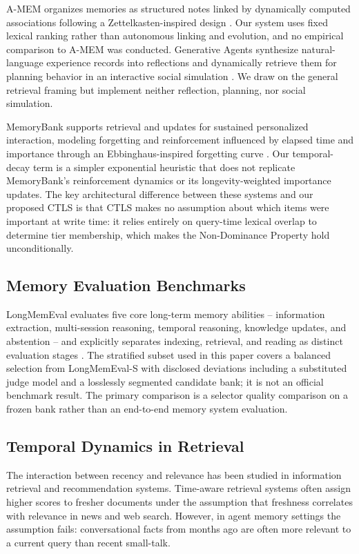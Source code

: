 A-MEM organizes memories as structured notes linked by dynamically computed associations following a Zettelkasten-inspired design \citep{ref_1aacba116cbe3c5b}. Our system uses fixed lexical ranking rather than autonomous linking and evolution, and no empirical comparison to A-MEM was conducted. Generative Agents synthesize natural-language experience records into reflections and dynamically retrieve them for planning behavior in an interactive social simulation \citep{ref_6e953134a3c04402}. We draw on the general retrieval framing but implement neither reflection, planning, nor social simulation.

MemoryBank supports retrieval and updates for sustained personalized interaction, modeling forgetting and reinforcement influenced by elapsed time and importance through an Ebbinghaus-inspired forgetting curve \citep{ref_713e886950406893}. Our temporal-decay term is a simpler exponential heuristic that does not replicate MemoryBank's reinforcement dynamics or its longevity-weighted importance updates. The key architectural difference between these systems and our proposed CTLS is that CTLS makes no assumption about which items were important at write time: it relies entirely on query-time lexical overlap to determine tier membership, which makes the Non-Dominance Property hold unconditionally.

\subsection{Memory Evaluation Benchmarks}

LongMemEval evaluates five core long-term memory abilities -- information extraction, multi-session reasoning, temporal reasoning, knowledge updates, and abstention -- and explicitly separates indexing, retrieval, and reading as distinct evaluation stages \citep{ref_ab2c226739f2f52a}. The stratified subset used in this paper covers a balanced selection from LongMemEval-S with disclosed deviations including a substituted judge model and a losslessly segmented candidate bank; it is not an official benchmark result. The primary comparison is a selector quality comparison on a frozen bank rather than an end-to-end memory system evaluation.

\subsection{Temporal Dynamics in Retrieval}

The interaction between recency and relevance has been studied in information retrieval and recommendation systems. Time-aware retrieval systems often assign higher scores to fresher documents under the assumption that freshness correlates with relevance in news and web search. However, in agent memory settings the assumption fails: conversational facts from months ago are often more relevant to a current query than recent small-talk.

